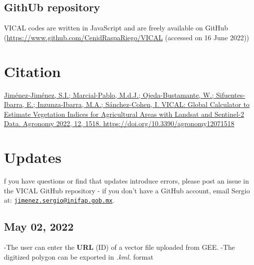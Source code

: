 \documentclass[
]{book}
\begin{document}
\hypertarget{github-repository}{%
\section{GithUb repository}\label{github-repository}}

VICAL codes are written in JavaScript and are freely available on GitHub (\url{https://www.github.com/CenidRaspaRiego/VICAL} (accessed on 16 June 2022))

\hypertarget{citation}{%
\chapter{Citation}\label{citation}}

\href{https://www.mdpi.com/2073-4395/12/7/1518}{Jiménez-Jiménez, S.I.; Marcial-Pablo, M.d.J.; Ojeda-Bustamante, W.; Sifuentes-Ibarra, E.; Inzunza-Ibarra, M.A.; Sánchez-Cohen, I. VICAL: Global Calculator to Estimate Vegetation Indices for Agricultural Areas with Landsat and Sentinel-2 Data. Agronomy 2022, 12, 1518. https://doi.org/10.3390/agronomy12071518}

\hypertarget{updates}{%
\chapter{Updates}\label{updates}}

f you have questions or find that updates introduce errors, please post an issue in the VICAL GitHub repository - if you don't have a GitHub account, email Sergio at: \href{mailto:jimenez.sergio@inifap.gob.mx}{\nolinkurl{jimenez.sergio@inifap.gob.mx}}.

\hypertarget{may-02-2022}{%
\section{May 02, 2022}\label{may-02-2022}}

-The user can enter the \textbf{URL} (ID) of a vector file uploaded from GEE.
-The digitized polygon can be exported in \emph{.kml.} format

  
\end{document}
